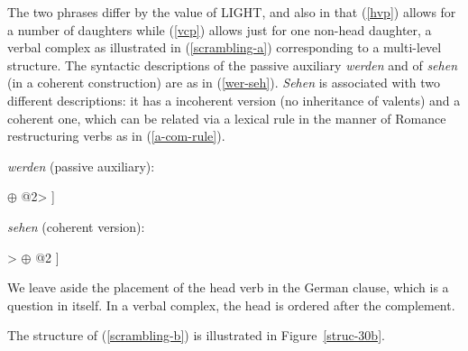 \documentclass[output=paper]{langsci/langscibook}
\begin{document}
	
	The two phrases differ by the value of LIGHT, and also in that (\ref{hvp}) allows for a number of daughters while (\ref{vcp}) allows just for one non-head daughter, a verbal complex as illustrated in (\ref{scrambling-a})  corresponding to a multi-level structure. 
	The syntactic descriptions of the passive auxiliary \textit{werden} and of \textit{sehen} (in a coherent construction) are as in (\ref{wer-seh}). \textit{Sehen}  is associated with two different descriptions: it has a incoherent version (no inheritance of valents) and a coherent one, which can be related via a lexical rule in the manner of Romance restructuring verbs as in (\ref{a-com-rule}).
	
	
	\begin{exe}
	\ex  \label{wer-seh}
	
	\begin{xlist} 
		
		\ex \label{werden}  \textit{werden} (passive auxiliary):
		
		\begin{avm}
			[{}xarg <@1>\\
			val < @1 , V[{}\normalfont{\textit{passive-part}}, \normalfont{\textsc{light}} + , \normalfont{\textsc{val}} <@1> $\oplus$ @2]  $\oplus$ @2>
			]
		\end{avm}
		
		
		\ex \label{sehen} \textit{sehen} (coherent version):
		
		\begin{avm}
			[{}x-arg <$\normalfont{\textsc{np}}_{i}$ >\\
			val <$\normalfont{\textsc{np}}_{i}$, $\normalfont{\textsc{np}}_{k}$, V[{}\normalfont{\textit{inf}}, \normalfont{\textsc{val}} < $\normalfont{\textsc{np}}_{k}$> $\oplus$ @2 ]> $\oplus$ @2
			]
			
		\end{avm}
		
	\end{xlist}
	
\end{exe}

	
	We leave aside the placement of the head verb in the German clause, which is a question in itself. In a verbal complex, the head is ordered after the complement. 
	
	The structure of (\ref{scrambling-b}) is illustrated in
        Figure~\ref{struc-30b}.
	
\end{document}
